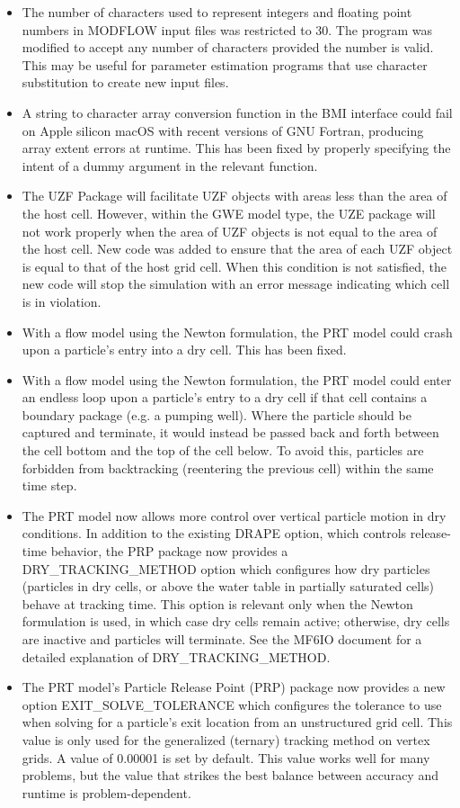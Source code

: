 \begin{itemize}
		\item The number of characters used to represent integers and floating point numbers in MODFLOW input files was restricted to 30.  The program was modified to accept any number of characters provided the number is valid.  This may be useful for parameter estimation programs that use character substitution to create new input files.
		\item A string to character array conversion function in the BMI interface could fail on Apple silicon macOS with recent versions of GNU Fortran, producing array extent errors at runtime. This has been fixed by properly specifying the intent of a dummy argument in the relevant function.
		\item The UZF Package will facilitate UZF objects with areas less than the area of the host cell.  However, within the GWE model type, the UZE package will not work properly when the area of UZF objects is not equal to the area of the host cell.  New code was added to ensure that the area of each UZF object is equal to that of the host grid cell.  When this condition is not satisfied, the new code will stop the simulation with an error message indicating which cell is in violation.
		\item With a flow model using the Newton formulation, the PRT model could crash upon a particle's entry into a dry cell. This has been fixed.
		\item With a flow model using the Newton formulation, the PRT model could enter an endless loop upon a particle's entry to a dry cell if that cell contains a boundary package (e.g. a pumping well). Where the particle should be captured and terminate, it would instead be passed back and forth between the cell bottom and the top of the cell below. To avoid this, particles are forbidden from backtracking (reentering the previous cell) within the same time step.
		\item The PRT model now allows more control over vertical particle motion in dry conditions. In addition to the existing DRAPE option, which controls release-time behavior, the PRP package now provides a DRY\_TRACKING\_METHOD option which configures how dry particles (particles in dry cells, or above the water table in partially saturated cells) behave at tracking time. This option is relevant only when the Newton formulation is used, in which case dry cells remain active; otherwise, dry cells are inactive and particles will terminate. See the MF6IO document for a detailed explanation of DRY\_TRACKING\_METHOD.
		\item The PRT model's Particle Release Point (PRP) package now provides a new option EXIT\_SOLVE\_TOLERANCE which configures the tolerance to use when solving for a particle's exit location from an unstructured grid cell. This value is only used for the generalized (ternary) tracking method on vertex grids. A value of 0.00001 is set by default. This value works well for many problems, but the value that strikes the best balance between accuracy and runtime is problem-dependent.
	\end{itemize}

